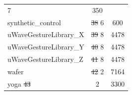\documentclass[natbib,smallextended]{svjour3}
\providecommand{\DIFdeltex}[1]{{\protect\color{red}\sout{#1}}}                      %
\providecommand{\DIFdelFL}[1]{\DIFdel{#1}} %
\providecommand{\DIFdelbeginFL}{} %
\providecommand{\DIFdelendFL}{} %
\providecommand{\DIFdel}[1]{\texorpdfstring{\DIFdeltex{#1}}{}} %
\begin{document}
\begin{table} [h!]
\begin{center}
\begin{tabular}{lcc}
\DIFdelendFL 7 &  350 \\
synthetic\_control  &  \DIFdelbeginFL \DIFdelFL{38 }%
\DIFdelendFL 6 &  600 \\
uWaveGestureLibrary\_X  &  \DIFdelbeginFL \DIFdelFL{39 }%
\DIFdelendFL 8 & 4478 \\
uWaveGestureLibrary\_Y  &  \DIFdelbeginFL \DIFdelFL{40 }%
\DIFdelendFL 8 & 4478 \\
uWaveGestureLibrary\_Z  &  \DIFdelbeginFL \DIFdelFL{41 }%
\DIFdelendFL 8 & 4478 \\
wafer  &  \DIFdelbeginFL \DIFdelFL{42 }%
\DIFdelendFL 2 & 7164 \\
yoga  \DIFdelbeginFL %
\DIFdelFL{43 }\DIFdelendFL &  2 & 3300 \\
\end{tabular}
\end{center}
\end{table}
\end{document}
